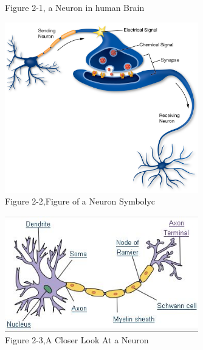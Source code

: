 \documentclass[12pt , a4paper]{article}
\begin{document}
\begin{figure}[h]
\centering
\setlength{\fboxrule}{5pt}
\caption*{Figure 2-1, a Neuron in human Brain}
\label{f-1-2}
\end{figure}
%
\begin{figure}[h]
\centering
\includegraphics[width=0.75\textwidth,frame]{x.jpg}
\caption*{Figure 2-2,Figure of a Neuron Symbolyc}
\label{f-1-3}
\end{figure}

\begin{figure}[h]
\centering
\includegraphics[width=0.75\textwidth,frame]{Neuron.jpg}
\caption*{Figure 2-3,A Closer Look At a Neuron}
\label{f-1-4}
\end{figure}
\end{document}
